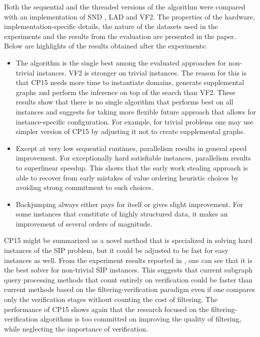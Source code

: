\documentclass{l4proj}
\newcounter{example}[section]
\begin{document}
Both the sequential and the threaded versions of the algorithm were compared with an implementation of SND \cite{SND}, LAD\cite{Solnon:2010a} and VF2\cite{vf2}. The properties of the hardware, implementation-specific details, the nature of the datasets used in the experiments and the results from the evaluation are presented in the paper\cite{CP2015}. Below are highlights of the results obtained after the experiments:
\begin{itemize}
\item The algorithm is the single best among the evaluated approaches for non-trivial instances. VF2 \cite{vf2} is stronger on trivial instances. The reason for this is that CP15 needs more time to instantiate domains, generate supplemental graphs and perform the inference on top of the search than VF2. These results show that there is no single algorithm that performs best on all instances and suggests for taking more flexible future approach that allows for instance-specific configuration. For example, for trivial problems one may use simpler version of CP15 by adjusting it not to create supplemental graphs.
\item Except at very low sequential runtimes, parallelism results in general speed improvement. For exceptionally hard satisfiable instances, parallelism results to superlinear speedup. This shows that the early work stealing approach is able to recover from early mistakes of value ordering heuristic choices by avoiding strong commitment to such choices.
\item Backjumping always either pays for itself or gives slight improvement. For some instances that constitute of highly structured data, it makes an improvement of several orders of magnitude.
\end{itemize}

CP15 might be summarized as a novel method that is specialized in solving hard instances of the SIP problem, but it could be adjusted to be fast for easy instances as well. From the experiment results reported in \cite{CP2015}, one can see that it is the best solver for non-trivial SIP instances. This suggests that current subgraph query processing methods that count entirely on verification could be faster than current methods based on the filtering-verification paradigm even if one compares only the verification stages without counting the cost of filtering. The performance of CP15 shows again that the research focused on the filtering-verification algorithms is too committed on improving the quality of filtering, while neglecting the importance of verification. 
\end{document}
